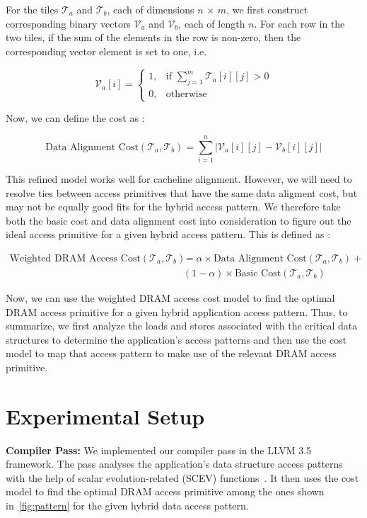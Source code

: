 \documentclass[letterpaper]{article}
\begin{document}
For the tiles $\mathcal{T}_{a}$ and $\mathcal{T}_{b}$, each of dimensions $n$
$\times$ $m$, we first construct corresponding binary vectors $\mathcal{V}_{a}$
and $\mathcal{V}_{b}$, each of length $n$. For each row in the two tiles, 
if the sum of the elements in the row is non-zero, then the corresponding vector
element is set to one, i.e.

\[
\mathcal{V}_{a}[i] =
\begin{cases}
1 , & \text{if } \sum_{j=1}^{m} \mathcal{T}_{a}[i][j] > 0 \\
0 , & \text{otherwise} 
\end{cases}
\]

Now, we can define the cost as :

$$\text{Data Alignment Cost}(\mathcal{T}_{a}, \mathcal{T}_{b}) = \sum_{i=1}^{n} 
| \mathcal{V}_{a}[i][j] - \mathcal{V}_{b}[i][j] |$$

This refined model works well for cacheline alignment. However, we will need to
resolve ties between access primitives that have the same data aligment cost,
but may not be equally good fits for the hybrid access pattern.
We therefore take both the basic cost and data alignment cost into consideration
to figure out the ideal access primitive for a given hybrid access pattern.
This is defined as :

\begin{align*}
\text{Weighted DRAM Access Cost}(\mathcal{T}_{a}, \mathcal{T}_{b}) 
&= \alpha \times \text{Data Alignment Cost}(\mathcal{T}_{a}, \mathcal{T}_{b})
+ \\
& (1-\alpha) \times \text{Basic Cost}(\mathcal{T}_{a}, \mathcal{T}_{b})
\end{align*}

Now, we can use the weighted DRAM access cost model to find the optimal DRAM
access primitive for a given hybrid application access pattern. Thus, to summarize,
we first analyze the loads and stores associated with the critical data
structures to determine the application's access patterns and then use the
cost model to map that access pattern to make use of the relevant DRAM access
primitive.

\section{Experimental Setup}

\textbf{Compiler Pass:} We implemented our compiler pass in the LLVM
3.5 framework. The pass analyses the application's data structure access
patterns with the help of scalar evolution-related (SCEV)
functions~\cite{llvm15}. 
It then uses the cost model to find the optimal DRAM access primitive 
among the ones shown in~\cref{fig:pattern} for the given hybrid data access
pattern.
\end{document}

